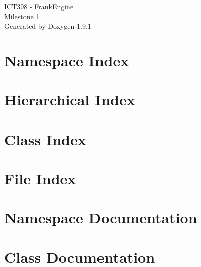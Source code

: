 \let\mypdfximage\pdfximage\def\pdfximage{\immediate\mypdfximage}\documentclass[twoside]{book}
\newcommand{\+}{\discretionary{\mbox{\scriptsize$\hookleftarrow$}}{}{}}
\newcommand{\clearemptydoublepage}{%
  \newpage{\pagestyle{empty}\cleardoublepage}%
}
\begin{document}
\raggedbottom

\hypersetup{pageanchor=false,
             bookmarksnumbered=true,
             pdfencoding=unicode
            }
\begin{titlepage}
\vspace*{7cm}
\begin{center}%
{\Large ICT398 -\/ Frank\+Engine \\[1ex]\large Milestone 1 }\\
\vspace*{1cm}
{\large Generated by Doxygen 1.9.1}\\
\end{center}
\end{titlepage}
\clearemptydoublepage
{}
\tableofcontents
\clearemptydoublepage
{}
\hypersetup{pageanchor=true}

\chapter{Namespace Index}

\chapter{Hierarchical Index}

\chapter{Class Index}

\chapter{File Index}

\chapter{Namespace Documentation}

\chapter{Class Documentation}







































\end{document}
